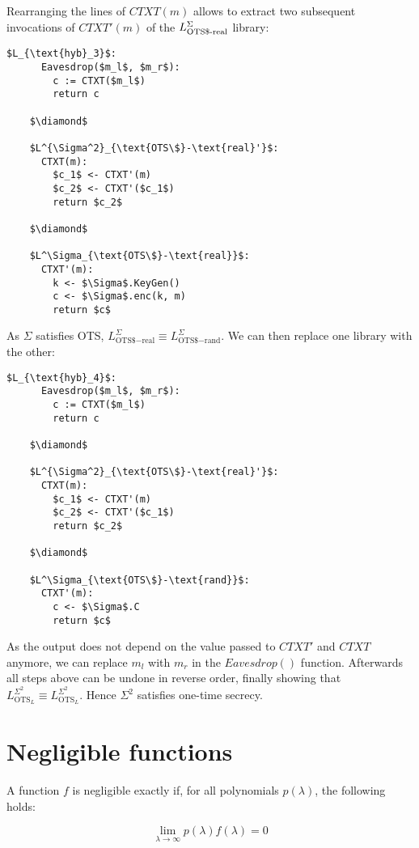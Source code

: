 \documentclass[a4paper]{scrreprt}
\begin{document}
Rearranging the lines of $CTXT(m)$ allows to extract two subsequent invocations
of $CTXT'(m)$ of the $L^\Sigma_{\text{OTS\textdollar-real}}$ library:

\begin{lstlisting}[mathescape=true, frame=single]
	$L_{\text{hyb}_3}$:
	  Eavesdrop($m_l$, $m_r$):
	    c := CTXT($m_l$)
	    return c

	$\diamond$

	$L^{\Sigma^2}_{\text{OTS\$}-\text{real}'}$:
	  CTXT(m):
	    $c_1$ <- CTXT'(m)
	    $c_2$ <- CTXT'($c_1$)
	    return $c_2$

	$\diamond$

	$L^\Sigma_{\text{OTS\$}-\text{real}}$:
	  CTXT'(m):
	    k <- $\Sigma$.KeyGen()
	    c <- $\Sigma$.enc(k, m)
	    return $c$
\end{lstlisting}	

As $\Sigma$ satisfies OTS, $L^\Sigma_{\text{OTS\$}-\text{real}} \equiv
L^\Sigma_{\text{OTS\$}-\text{rand}}$. We can then replace one library with the
other:

\begin{lstlisting}[mathescape=true, frame=single]
	$L_{\text{hyb}_4}$:
	  Eavesdrop($m_l$, $m_r$):
	    c := CTXT($m_l$)
	    return c

	$\diamond$

	$L^{\Sigma^2}_{\text{OTS\$}-\text{real}'}$:
	  CTXT(m):
	    $c_1$ <- CTXT'(m)
	    $c_2$ <- CTXT'($c_1$)
	    return $c_2$

	$\diamond$

	$L^\Sigma_{\text{OTS\$}-\text{rand}}$:
	  CTXT'(m):
	    c <- $\Sigma$.C
	    return $c$
\end{lstlisting}	

As the output does not depend on the value passed to $CTXT'$ and $CTXT$
anymore, we can replace $m_l$ with $m_r$ in the $Eavesdrop()$ function.
Afterwards all steps above can be undone in reverse order, finally showing that
$L^{\Sigma^2}_{\text{OTS}_L} \equiv L^{\Sigma^2}_{\text{OTS}_L}$. Hence
$\Sigma^2$ satisfies one-time secrecy.

\section{Negligible functions}

A function $f$ is negligible exactly if, for all polynomials $p(\lambda)$,
the following holds:

\[
	\lim_{\lambda \rightarrow \infty} p(\lambda) f(\lambda) = 0
\]
\end{document}
